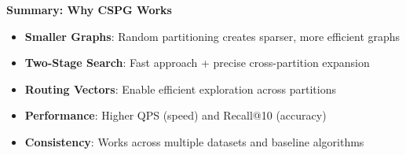 \begin{frame}
\begin{center}
\LARGE\textbf{Summary: Why CSPG Works}
\end{center}

\vspace{0.5cm}

\begin{itemize}
    \item \textbf{Smaller Graphs}: Random partitioning creates sparser, more efficient graphs
    \item \textbf{Two-Stage Search}: Fast approach + precise cross-partition expansion
    \item \textbf{Routing Vectors}: Enable efficient exploration across partitions
    \item \textbf{Performance}: Higher QPS (speed) and Recall@10 (accuracy)
    \item \textbf{Consistency}: Works across multiple datasets and baseline algorithms
\end{itemize}
\end{frame}